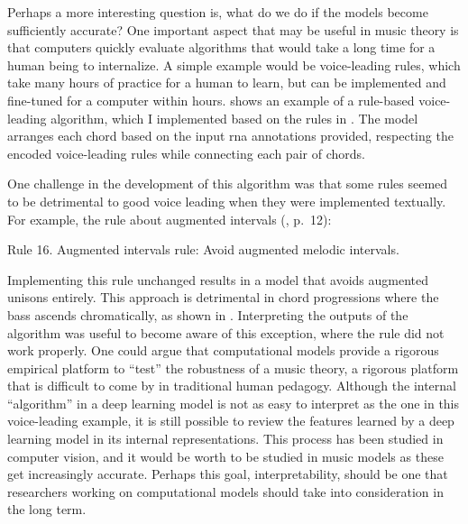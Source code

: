 

Perhaps a more interesting question is, what do we do if the
models become sufficiently accurate? One important aspect
that may be useful in music theory is that computers quickly
evaluate algorithms that would take a long time for a human
being to internalize. A simple example would be
voice-leading rules, which take many hours of practice for a
human to learn, but can be implemented and fine-tuned for a
computer within hours. 
shows an example of a rule-based voice-leading algorithm,
which I implemented based on the rules in
\textcite[10]{huron2016voice}.
The model arranges each chord based on the input \gls{rna}
annotations provided, respecting the encoded voice-leading
rules while connecting each pair of chords. 


One challenge in the development of this algorithm was that
some rules seemed to be detrimental to good voice leading
when they were implemented textually. For example, the rule
about augmented intervals (\cite{huron2016voice}, p.~12):

\begin{italicsquote}
    Rule 16. Augmented intervals rule: Avoid augmented
    melodic intervals.
\end{italicsquote}

Implementing this rule unchanged results in a model that
avoids augmented unisons entirely. This approach is
detrimental in chord progressions where the bass ascends
chromatically, as shown in
. Interpreting the outputs
of the algorithm was useful to become aware of this
exception, where the rule did not work properly. One could
argue that computational models provide a rigorous empirical
platform to ``test'' the robustness of a music theory, a
rigorous platform that is difficult to come by in
traditional human pedagogy. Although the internal
``algorithm'' in a deep learning model is not as easy to
interpret as the one in this voice-leading example, it is
still possible to review the features learned by a deep
learning model in its internal representations. This process
has been studied in computer vision, and it would be worth
to be studied in music models as these get increasingly
accurate. Perhaps this goal, interpretability, should be one
that researchers working on computational models should take
into consideration in the long term.
